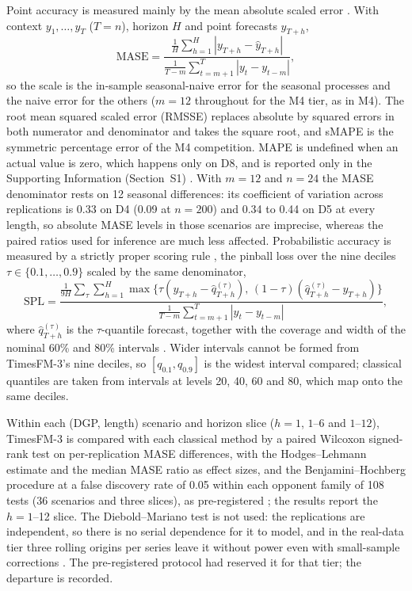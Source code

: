 Point accuracy is measured mainly by the mean absolute scaled error \citep[MASE;][]{hyndman2006mase}.
With context $y_1, \dots, y_T$ ($T = n$), horizon $H$ and point forecasts $\hat{y}_{T+h}$,
\begin{equation}
\label{eq:mase}
\text{MASE} = \frac{\frac{1}{H}\sum_{h=1}^H |y_{T+h} - \hat{y}_{T+h}|}{\frac{1}{T-m}\sum_{t=m+1}^T |y_t - y_{t-m}|},
\end{equation}
so the scale is the in-sample seasonal-naive error for the seasonal processes and the naive error for the
others ($m = 12$ throughout for the M4 tier, as in M4). The root mean squared scaled error (RMSSE) replaces
absolute by squared errors in both numerator and denominator and takes the square root, and sMAPE is the
symmetric percentage error of the M4 competition. MAPE is undefined when an actual value is zero, which
happens only on D8, and is reported only in the Supporting Information (Section~S1)
\citep{hyndman2006mase, kolassa2016count}. With $m = 12$ and $n = 24$ the MASE denominator rests on 12
seasonal differences: its coefficient of variation across replications is 0.33 on D4 (0.09 at $n = 200$)
and 0.34 to 0.44 on D5 at every length, so absolute MASE levels in those scenarios are imprecise, whereas
the paired ratios used for inference are much less affected. Probabilistic accuracy is measured by a strictly proper scoring
rule \citep{gneiting2007scoring}, the pinball loss over the nine deciles $\tau \in \{0.1, \dots, 0.9\}$
scaled by the same denominator,
\begin{equation}
\label{eq:spl}
\text{SPL} = \frac{\frac{1}{9H} \sum_{\tau} \sum_{h=1}^H \max\{\tau(y_{T+h} - \hat{q}^{(\tau)}_{T+h}),\, (1-\tau)(\hat{q}^{(\tau)}_{T+h} - y_{T+h})\}}{\frac{1}{T-m}\sum_{t=m+1}^T |y_t - y_{t-m}|},
\end{equation}
where $\hat{q}^{(\tau)}_{T+h}$ is the $\tau$-quantile forecast, together with the coverage and width of
the nominal 60\% and 80\% intervals \citep{gneiting2007calibration}. Wider intervals cannot be formed from
TimesFM-3's nine deciles, so $[q_{0.1}, q_{0.9}]$ is the widest interval compared; classical quantiles are
taken from intervals at levels 20, 40, 60 and 80, which map onto the same deciles.

Within each (DGP, length) scenario and horizon slice ($h = 1$, $1$--$6$ and $1$--$12$), TimesFM-3 is compared
with each classical method by a paired Wilcoxon signed-rank test \citep{wilcoxon1945} on per-replication
MASE differences, with the Hodges--Lehmann estimate \citep{hodges1963} and the median MASE ratio as effect
sizes, and the Benjamini--Hochberg procedure at a false discovery rate of 0.05 within each opponent family
of 108 tests (36 scenarios and three slices), as pre-registered \citep{benjamini1995fdr}; the results report the
$h = 1$--12 slice. The Diebold--Mariano test \citep{diebold1995comparing} is not used: the replications are
independent, so there is no serial dependence for it to model, and in the real-data tier three rolling
origins per series leave it without power even with small-sample corrections \citep{harvey1997testing}. The
pre-registered protocol had reserved it for that tier; the departure is recorded.

